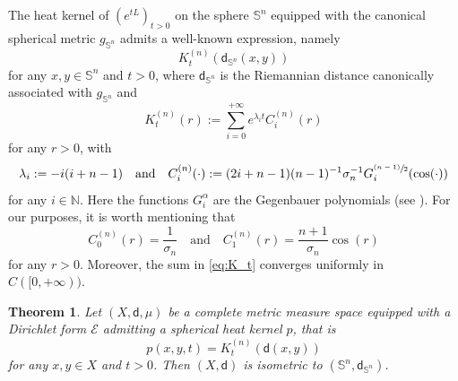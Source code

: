 \documentclass[JEP,XML,SOM,Unicode,published]{cedram}
\newcommand{\psfrac}[2]{\sfrac{(#1)}{#2}}
\theoremstyle{plain}
\newtheorem{theorem}{Theorem}[section]
\theoremstyle{definition}
\newcommand{\setN}{\mathbb{N}}
\newcommand{\cE}{\mathcal{E}}
\newcommand{\dist}{\mathsf{d}}
\begin{document}
The heat kernel of $(e^{tL})_{t>0}$ on the sphere $\mathbb{S}^n$ equipped with the canonical spherical metric $g_{\mathbb{S}^n}$ admits a well-known expression, namely\vspace*{-3pt}
\[
K_t^{(n)}(\dist_{\mathbb{S}^n}(x,y))
\]
for any $x,y \in \mathbb{S}^n$ and $t>0$, where $\dist_{\mathbb{S}^n}$ is the Riemannian distance canonically associated with $g_{\mathbb{S}^n}$ and\vspace*{-5pt}
\begin{equation}\label{eq:K_t}
K_t^{(n)}(r):=\sum_{i=0}^{+\infty} e^{\lambda_i t} C_i^{(n)}(r)\end{equation}
for any $r>0$, with
\[
\lambda_i:= -i(i+n-1)\quad\text{and}\quad
C_i^{(n)}(\cdot):=(2i+n-1)(n-1)^{-1}\sigma_n^{-1} G_i^{\psfrac{n-1}{2}}(\cos(\cdot))
\]
for any $i \in \setN$. Here the functions $G_i^\alpha$ are the Gegenbauer polynomials (see \eg \cite{AtkinsonHan}). For our purposes, it is worth mentioning that
\[
C_0^{(n)}(r)=\frac{1}{\sigma_n} \quad \text{and} \quad C_1^{(n)}(r)=\frac{n+1}{\sigma_n}\cos(r)
\]
for any $r>0$. Moreover, the sum in \eqref{eq:K_t} converges uniformly in $C([0,+\infty))$.

\begin{theorem}
Let $(X,\dist,\mu)$ be a complete metric measure space equipped with a Dirichlet form $\cE$ admitting a spherical heat kernel $p$, that is
\begin{equation}\label{eq:spher}
p(x,y,t) = K_t^{(n)}(\dist(x,y))
\end{equation}
for any $x, y \in X$ and $t>0$. Then $(X,\dist)$ is isometric to $(\mathbb{S}^n,\dist_{\mathbb{S}^n})$.
\end{theorem}
\end{document}
